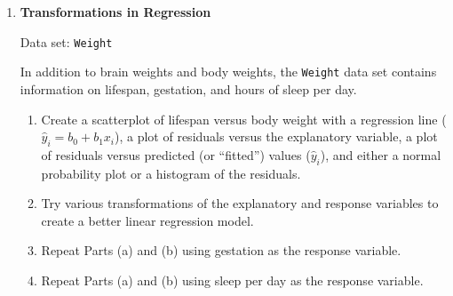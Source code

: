 \documentclass[
]{report}
\begin{document}
\begin{enumerate}
  \begin{enumerate}
    \item Create individual value plots or side-by-side boxplots of the bradykininogen levels for each group. Compare the mean and standard deviation of each group. Do the data within each group look consistent with data from a normal population?
      \item Calculate the ANOVA model estimates in order to create a normal probability plot of the residuals. Do the error terms look consistent with data from a normal population?
      \item Transform the data by taking the log of the response. Create individual value plots or side-by-side boxplots of the transformed responses. Compare the mean and standard deviation of each group. Do the transformed data within each group look consistent with data from a normal population?
      \item Calculate the ANOVA model estimates using the transformed data in order to create a normal probability plot of the residuals. Do the error terms look consistent with data from a normal population? You may have to try out more than one transformation before you are satisfied with your answer to this part and part(c).
      \item Using the transformed data, calculate an ANOVA table, $\scriptstyle F$-test, and $\scriptstyle p$-value to determine if the three patient types differed in their mean bradykininogen levels.
    \end{enumerate}

  \item \textbf{Transformations in Regression}

Data set: \texttt{Weight}

In addition to brain weights and body weights, the \texttt{Weight} data set contains information on lifespan, gestation, and hours of sleep per day.

  \begin{enumerate}
    \item Create a scatterplot of lifespan versus body weight with a regression line ($\scriptstyle \hat{y}_i = b_0 + b_1 x_i$), a plot of residuals versus the explanatory variable, a plot of residuals versus predicted (or “fitted”) values ($\scriptstyle \hat{y}_i$), and either a normal probability plot or a histogram of the residuals.
      \item Try various transformations of the explanatory and response variables to create a better linear regression model.
      \item Repeat Parts (a) and (b) using gestation as the response variable.
      \item Repeat Parts (a) and (b) using sleep per day as the response variable.
    \end{enumerate}


\end{enumerate}
\end{document}
